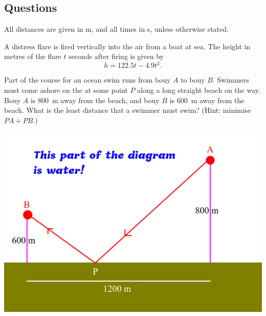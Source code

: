 \subsection*{Questions}
All distances are given in \si{\metre}, and all times in \si{\second}, unless otherwise stated.
\begin{questions}
  \question A distress flare is fired vertically into the air from a boat at sea. The height in metres of the flare $ t $ seconds
            after firing is given by
            \begin{displaymath}
              h = 122.5t - 4.9t^2.
            \end{displaymath}
  \question Part of the course for an ocean swim runs from bouy $ A $ to bouy $ B $. Swimmers must come ashore
            on the at some point $ P $ along a long straight beach on the way. Bouy $ A $ is \SI{800}{\metre} away
            from the beach, and bouy $ B $ is \SI{600}{\metre} away from the beach. What is the least distance that
            a swimmer must swim? (Hint: minimise $ PA + PB $.)
            \begin{center}
              \includegraphics[width=0.5\linewidth]{bouys}
            \end{center}
\end{questions}

